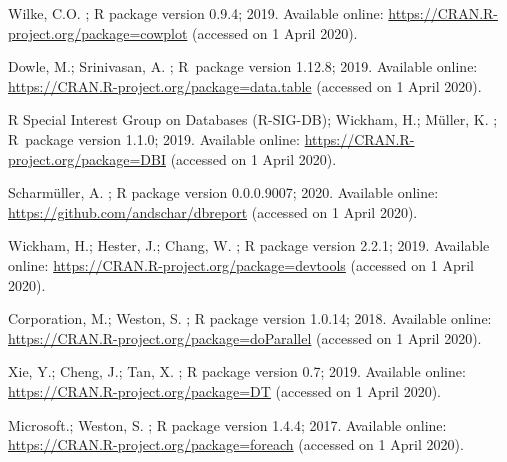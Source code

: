 \documentclass[data,datadescriptor,accept,moreauthors,pdftex]{Definitions/mdpi}
\begin{document}
\begin{thebibliography}{999}
Wilke, C.O.
;
\newblock R package version 0.9.4;  2019.
\newblock Available online: \url{https://CRAN.R-project.org/package=cowplot}
\newblock (accessed on 1 April 2020).

Dowle, M.; Srinivasan, A.
;
\newblock R~package version 1.12.8;  2019.
\newblock Available online: \url{https://CRAN.R-project.org/package=data.table}
\newblock (accessed on 1 April 2020).

{R Special Interest Group on Databases (R-SIG-DB)}; Wickham, H.; Müller, K.
;
\newblock R~package version 1.1.0;  2019.
\newblock Available online: \url{https://CRAN.R-project.org/package=DBI}
\newblock (accessed on 1 April 2020).

Scharmüller, A.
;
\newblock R package version 0.0.0.9007;  2020.
\newblock Available online: \url{https://github.com/andschar/dbreport}
\newblock (accessed on 1 April 2020).

Wickham, H.; Hester, J.; Chang, W.
;
\newblock R package version 2.2.1;  2019.
\newblock Available online: \url{https://CRAN.R-project.org/package=devtools}
\newblock (accessed on 1 April 2020).

Corporation, M.; Weston, S.
;
\newblock R package version 1.0.14;  2018.
\newblock Available online: \url{https://CRAN.R-project.org/package=doParallel}
\newblock (accessed on 1 April 2020).

Xie, Y.; Cheng, J.; Tan, X.
;
\newblock R package version 0.7;  2019.
\newblock Available online: \url{https://CRAN.R-project.org/package=DT}
\newblock (accessed on 1 April 2020).

{Microsoft}.; Weston, S.
;
\newblock R package version 1.4.4;  2017.
\newblock Available online: \url{https://CRAN.R-project.org/package=foreach}
\newblock (accessed on 1 April 2020).


\end{thebibliography}
\end{document}
